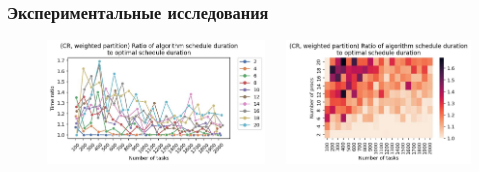 
\begin{frame}
    \frametitle{Экспериментальные исследования}
    \begin{figure}
        \begin{columns}
            \begin{column}{0.5\textwidth}
                \includegraphics[width=\textwidth]{imgs/experiments/CR/full_analysis/CR/gr_amalgamated_w.jpg}
            \end{column}
            \begin{column}{0.5\textwidth}
                \includegraphics[width=\textwidth]{imgs/experiments/CR/full_analysis/CR/tr_heatmap_w.jpg}
            \end{column}
        \end{columns}
    \end{figure}
\end{frame}


